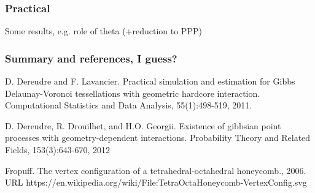 \documentclass[c, 10pt]{beamer}
\begin{document}
\begin{frame}\frametitle{Practical}
	Some results, e.g. role of theta (+reduction to PPP)
	
\end{frame}


\begin{frame}[noframenumbering]\frametitle{Summary and references, I guess?}
	
D. Dereudre and F. Lavancier. Practical simulation and estimation for
Gibbs Delaunay-Voronoi tessellations with geometric hardcore interaction.
Computational Statistics and Data Analysis, 55(1):498-519, 2011.

D. Dereudre, R. Drouilhet, and H.O. Georgii. Existence of gibbsian point
processes with geometry-dependent interactions. Probability Theory and
Related Fields, 153(3):643-670, 2012


Fropuff. The vertex configuration of a tetrahedral-octahedral honeycomb., 2006.
URL https://en.wikipedia.org/wiki/File:TetraOctaHoneycomb-VertexConfig.svg

\end{frame}
\end{document}
